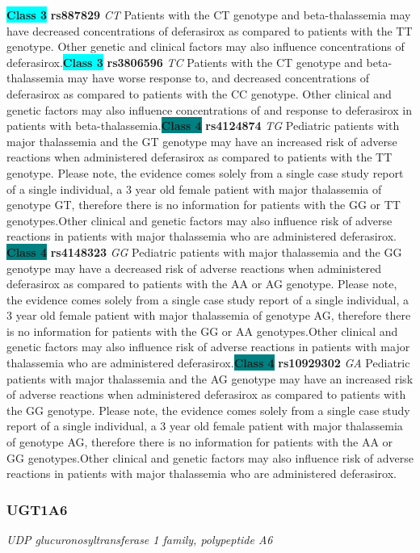 \documentclass{report}
\begin{document}
\textbf{\colorbox{cyan} {Class 3}} \textbf{ rs887829 } \textit{ CT }
Patients with the CT genotype and beta-thalassemia may have decreased concentrations of deferasirox as compared to patients with the TT genotype. Other genetic and clinical factors may also influence concentrations of deferasirox.\newline\textbf{\colorbox{cyan} {Class 3}} \textbf{ rs3806596 } \textit{ TC }
Patients with the CT genotype and beta-thalassemia may have worse response to, and decreased concentrations of deferasirox as compared to patients with the CC genotype. Other clinical and genetic factors may also influence concentrations of and response to deferasirox in patients with beta-thalassemia.\newline\textbf{\colorbox{teal} {Class 4}} \textbf{ rs4124874 } \textit{ TG }
Pediatric patients with major thalassemia and the GT genotype may have an increased risk of adverse reactions when administered deferasirox as compared to patients with the TT genotype. Please note, the evidence comes solely from a single case study report of a single individual, a 3 year old female patient with major thalassemia of genotype GT, therefore there is no information for patients with the GG or TT genotypes.Other clinical and genetic factors may also influence risk of adverse reactions in patients with major thalassemia who are administered deferasirox. \newline\textbf{\colorbox{teal} {Class 4}} \textbf{ rs4148323 } \textit{ GG }
Pediatric patients with major thalassemia and the GG genotype may have a decreased risk of adverse reactions when administered deferasirox as compared to patients with the AA or AG genotype. Please note, the evidence comes solely from a single case study report of a single individual, a 3 year old female patient with major thalassemia of genotype AG, therefore there is no information for patients with the GG or AA genotypes.Other clinical and genetic factors may also influence risk of adverse reactions in patients with major thalassemia who are administered deferasirox.\newline\textbf{\colorbox{teal} {Class 4}} \textbf{ rs10929302 } \textit{ GA }
Pediatric patients with major thalassemia and the AG genotype may have an increased risk of adverse reactions when administered deferasirox as compared to patients with the GG genotype. Please note, the evidence comes solely from a single case study report of a single individual, a 3 year old female patient with major thalassemia of genotype AG, therefore there is no information for patients with the AA or GG genotypes.Other clinical and genetic factors may also influence risk of adverse reactions in patients with major thalassemia who are administered deferasirox.\newline\subsubsection{ UGT1A6 }
\textit{ UDP glucuronosyltransferase 1 family, polypeptide A6 }
\end{document}
